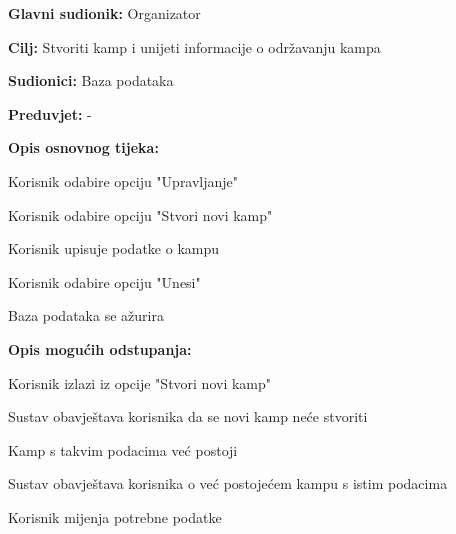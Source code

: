 					\noindent {}
					\begin{packed_item}
						
						\item \textbf{Glavni sudionik: } Organizator
						\item  \textbf{Cilj:} Stvoriti kamp i unijeti informacije o održavanju kampa
						\item  \textbf{Sudionici:} Baza podataka
						\item  \textbf{Preduvjet:} -
						\item  \textbf{Opis osnovnog tijeka:}
						
						\item[] \begin{packed_enum}
							
							\item Korisnik odabire opciju "Upravljanje"
							\item Korisnik odabire opciju "Stvori novi kamp"
							\item Korisnik upisuje podatke o kampu
							\item Korisnik odabire opciju "Unesi"
							\item Baza podataka se ažurira
						\end{packed_enum}
						
						\item  \textbf{Opis mogućih odstupanja:}
						
						\item[] \begin{packed_item}
							\item[3.a] Korisnik izlazi iz opcije "Stvori novi kamp"
							\item[] \begin{packed_enum}
								
								\item Sustav obavještava korisnika da se novi kamp neće stvoriti
								
							\end{packed_enum}
							
							\item[4.a] Kamp s takvim podacima već postoji
							\item[] \begin{packed_enum}
								
								\item Sustav obavještava korisnika o već postojećem kampu s istim podacima
								\item Korisnik mijenja potrebne podatke
								
							\end{packed_enum}
						\end{packed_item}
					\end{packed_item}
					

